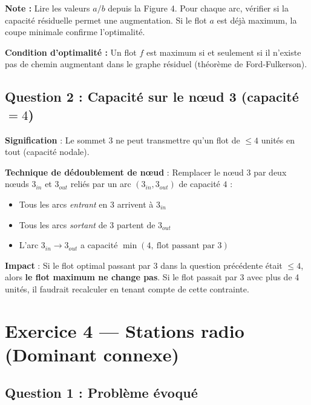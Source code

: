 \documentclass[12pt,a4paper]{article}
\begin{document}
\begin{solution}
\textbf{Note :} Lire les valeurs $a/b$ depuis la Figure 4. Pour chaque arc, vérifier si la capacité résiduelle permet une augmentation. Si le flot $a$ est déjà maximum, la coupe minimale confirme l'optimalité.

\textbf{Condition d'optimalité :} Un flot $f$ est maximum si et seulement si il n'existe pas de chemin augmentant dans le graphe résiduel (théorème de Ford-Fulkerson).
\end{solution}

\subsection{Question 2 : Capacité sur le nœud 3 (capacité $= 4$)}

\begin{solution}
\textbf{Signification} : Le sommet 3 ne peut transmettre qu'un flot de $\le 4$ unités en tout (capacité nodale).

\textbf{Technique de dédoublement de nœud} : Remplacer le nœud $3$ par deux nœuds $3_{in}$ et $3_{out}$ reliés par un arc $(3_{in}, 3_{out})$ de capacité $4$ :
\begin{itemize}
    \item Tous les arcs \emph{entrant} en 3 arrivent à $3_{in}$
    \item Tous les arcs \emph{sortant} de 3 partent de $3_{out}$
    \item L'arc $3_{in} \to 3_{out}$ a capacité $\min(4,\ \text{flot passant par 3})$
\end{itemize}

\textbf{Impact} : Si le flot optimal passant par 3 dans la question précédente était $\le 4$, alors \textbf{le flot maximum ne change pas}. Si le flot passait par 3 avec plus de 4 unités, il faudrait recalculer en tenant compte de cette contrainte.
\end{solution}

\newpage
\section{Exercice 4 --- Stations radio (Dominant connexe)}

\subsection{Question 1 : Problème évoqué}
\end{document}
